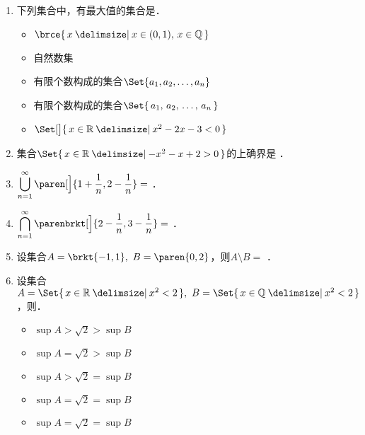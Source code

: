 \begin{enumerate}
\item 下列集合中，有最大值的集合是\uline{\makebox[4em]{}}．
  \begin{itemize}
    \renewcommand{\labelitemi}{\faCircleThin}
  \item \(\brce{\,x \mid x \in (0, 1),\, x \in \Q\,}\)
  \item 自然数集
    \ifshowsol
    \item[\faCircle] 有限个数构成的集合\(\Set{a_1, a_2, \dots, a_n}\)
    \else
    \item 有限个数构成的集合\(\Set{\,a_1,\, a_2,\, \dots,\, a_n\,}\)
    \fi
  \item \(\Set[\big]{\,x \in \R \mid x^2 - 2x -3 < 0\,}\)
  \end{itemize}

\item 集合\(\Set{\,x \in \R \mid -x^2 - x + 2 > 0\,}\)的上确界是
  \ifshowsol
    \uline{}
  \else
    \uline{\makebox[4em]{}}%
  \fi．

\item \(\displaystyle \bigcup_{n=1}^\infty \paren[\Big]{1 + \frac1n, 2 - \frac1n} =\)
  \ifshowsol
    \uline{}
  \else
    \uline{\makebox[4em]{}}%
  \fi．

\item \(\displaystyle \bigcap_{n=1}^\infty \parenbrkt[\Big]{2-\frac1n, 3-\frac1n} =\)
  \ifshowsol
    \uline{}
  \else
    \uline{\makebox[4em]{}}%
  \fi．

\item 设集合\(A = \brkt{-1,1},\ B = \paren{0,2}\)，则\(A \setminus B =\)
  \ifshowsol
    \uline{}
  \else
    \uline{\makebox[4em]{}}%
  \fi．

\item 设集合\(A = \Set{\,x \in \R \mid x^2 < 2\,},\ B = \Set{\,x \in \Q \mid x^2 < 2\,}\)，则\uline{\makebox[4em]{}}．
  \begin{itemize}
    \renewcommand{\labelitemi}{\faCircleThin}
  \item \(\sup A > \sqrt2 > \sup B\)
  \item \(\sup A = \sqrt2 > \sup B\)
  \item \(\sup A > \sqrt2 = \sup B\)
    \ifshowsol
    \item[\faCircle] \(\sup A = \sqrt2 = \sup B\)
    \else
    \item \(\sup A = \sqrt2 = \sup B\)
    \fi
  \end{itemize}


\end{enumerate}
